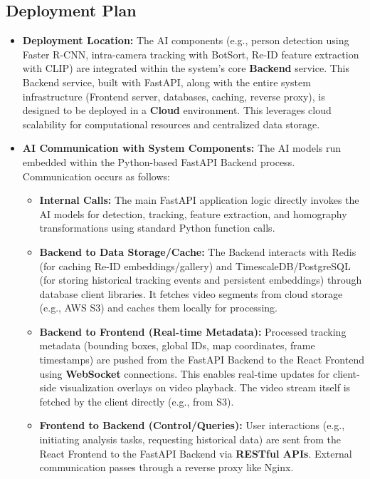\subsection{Deployment Plan}
\label{subsection:deployment_plan_aic}
\begin{itemize}
    \item \textbf{Deployment Location:}
        The AI components (e.g., person detection using Faster R-CNN, intra-camera tracking with BotSort, Re-ID feature extraction with CLIP) are integrated within the system's core \textbf{Backend} service. This Backend service, built with FastAPI, along with the entire system infrastructure (Frontend server, databases, caching, reverse proxy), is designed to be deployed in a \textbf{Cloud} environment. This leverages cloud scalability for computational resources and centralized data storage.

    \item \textbf{AI Communication with System Components:}
        The AI models run embedded within the Python-based FastAPI Backend process. Communication occurs as follows:
        \begin{itemize}
            \item \textbf{Internal Calls:} The main FastAPI application logic directly invokes the AI models for detection, tracking, feature extraction, and homography transformations using standard Python function calls.
            \item \textbf{Backend to Data Storage/Cache:} The Backend interacts with Redis (for caching Re-ID embeddings/gallery) and TimescaleDB/PostgreSQL (for storing historical tracking events and persistent embeddings) through database client libraries. It fetches video segments from cloud storage (e.g., AWS S3) and caches them locally for processing.
            \item \textbf{Backend to Frontend (Real-time Metadata):} Processed tracking metadata (bounding boxes, global IDs, map coordinates, frame timestamps) are pushed from the FastAPI Backend to the React Frontend using \textbf{WebSocket} connections. This enables real-time updates for client-side visualization overlays on video playback. The video stream itself is fetched by the client directly (e.g., from S3).
            \item \textbf{Frontend to Backend (Control/Queries):} User interactions (e.g., initiating analysis tasks, requesting historical data) are sent from the React Frontend to the FastAPI Backend via \textbf{RESTful APIs}. External communication passes through a reverse proxy like Nginx.
        \end{itemize}


\end{itemize}
